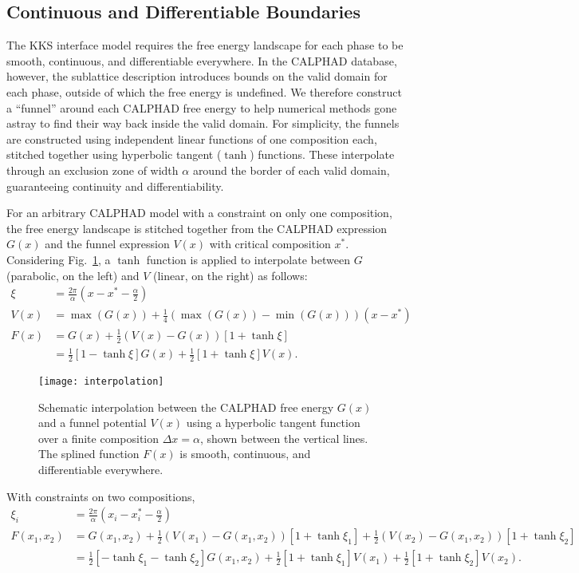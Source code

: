 \documentclass[10pt]{article}
\begin{document}
		\subsection{Continuous and Differentiable Boundaries}
			The KKS interface model \cite{Kim1999} requires the free energy landscape for each phase to be smooth, continuous, and differentiable everywhere.
			In the CALPHAD database, however, the sublattice description introduces bounds on the valid domain for each phase,
			outside of which the free energy is undefined.
			We therefore construct a ``funnel'' around each CALPHAD free energy to help numerical methods gone astray to find their way back inside the valid domain.
			For simplicity, the funnels are constructed using independent linear functions of one composition each, stitched together using hyperbolic tangent ($\tanh$) functions.
			These interpolate through an exclusion zone of width $\alpha$ around the border of each valid domain, guaranteeing continuity and differentiability.
			
			For an arbitrary CALPHAD model with a constraint on only one composition, the free energy landscape is stitched together from
			the CALPHAD expression $G(x)$ and the funnel expression $V(x)$ with critical composition $x^*$.
			Considering Fig.~\ref{fig:interp}, a $\tanh$ function is applied to interpolate between $G$ (parabolic, on the left) and $V$ (linear, on the right) as follows:
			\begin{align}\nonumber
				\xi &= \frac{2\pi}{\alpha}\left(x-x^*-\frac{\alpha}{2}\right)\\
				V(x) &= \max(G(x)) + \frac{1}{4}\left(\max(G(x))-\min(G(x))\right)\left(x - x^*\right)\\\nonumber
				F(x) &= G(x) + \frac{1}{2}\left(V(x)-G(x)\right)\left[1 + \tanh\xi\right]\\
				     &= \frac{1}{2}\left[1 - \tanh\xi\right]G(x) + \frac{1}{2}\left[1 + \tanh\xi\right]V(x).
			\end{align}
			\begin{figure}[!ht]\centering
				\texttt{[image: interpolation]}
				\caption{Schematic interpolation between the CALPHAD free energy $G(x)$ and a funnel potential $V(x)$
				         using a hyperbolic tangent function over a finite composition $\Delta x = \alpha$,
				         shown between the vertical lines.
				         The splined function $F(x)$ is smooth, continuous, and differentiable everywhere.}
				\label{fig:interp}
			\end{figure}
			With constraints on two compositions,
			\begin{align}\label{eqn:xi}
				\xi_i &= \frac{2\pi}{\alpha}\left(x_i-x^*_i-\frac{\alpha}{2}\right)\\\nonumber
				F(x_1,x_2) &= G(x_1,x_2) + \frac{1}{2}\left(V(x_1)-G(x_1,x_2)\right)\left[1 + \tanh\xi_1\right] + \frac{1}{2}\left(V(x_2)-G(x_1,x_2)\right)\left[1 + \tanh\xi_2\right]\\
				           &= \frac{1}{2}\left[-\tanh\xi_1 -\tanh\xi_2\right]G(x_1,x_2) + \frac{1}{2}\left[1 + \tanh\xi_1\right]V(x_1) + \frac{1}{2}\left[1 + \tanh\xi_2\right]V(x_2).
			\end{align}
\end{document}
